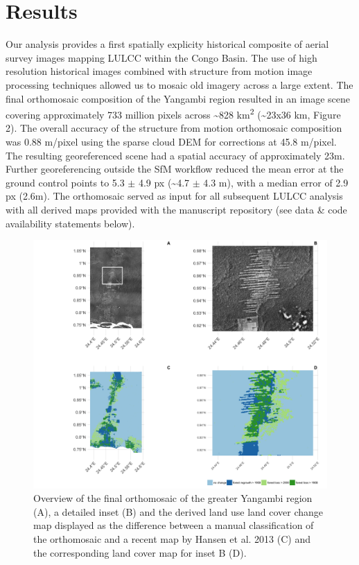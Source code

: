 \documentclass[remote sensing,article,submit,moreauthors,pdftex,10pt,a4paper]{mdpi}
\begin{document}
\hypertarget{results}{%
\section{Results}\label{results}}

Our analysis provides a first spatially explicity historical composite
of aerial survey images mapping LULCC within the Congo Basin. The use of
high resolution historical images combined with structure from motion
image processing techniques allowed us to mosaic old imagery across a
large extent. The final orthomosaic composition of the Yangambi region
resulted in an image scene covering approximately 733 million pixels
across \textasciitilde{}828 km\textsuperscript{2}
(\textasciitilde{}23x36 km, Figure 2). The overall accuracy of the
structure from motion orthomosaic composition was 0.88 m/pixel using the
sparse cloud DEM for corrections at 45.8 m/pixel. The resulting
georeferenced scene had a spatial accuracy of approximately 23m. Further
georeferencing outside the SfM workflow reduced the mean error at the
ground control points to 5.3 \(\pm\) 4.9 px (\textasciitilde{}4.7
\(\pm\) 4.3 m), with a median error of 2.9 px (2.6m). The orthomosaic
served as input for all subsequent LULCC analysis with all derived maps
provided with the manuscript repository (see data \& code availability
statements below).

\begin{figure}
\includegraphics[width=1\linewidth]{./figures/orthomosaic_maps} \caption{Overview of the final orthomosaic of the greater Yangambi region (A), a detailed inset (B) and the derived land use land cover change map displayed as the difference between a manual classification of the orthomosaic and a recent map by Hansen et al. 2013 (C) and the corresponding land cover map for inset B (D).}\label{fig:unnamed-chunk-5}
\end{figure}
\end{document}
